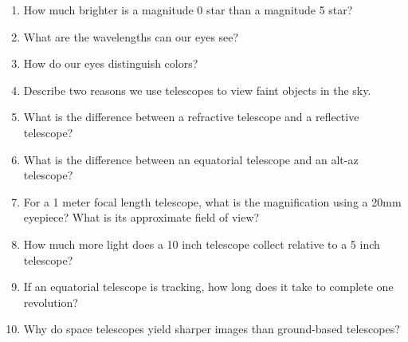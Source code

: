 
\begin{enumerate}
\item How much brighter is a magnitude 0 star than a magnitude 5 star?
\vspace{80pt}
\item What are the wavelengths can our eyes see?
\vspace{80pt}
\item How do our eyes distinguish colors?
\vspace{80pt}
\item Describe two reasons we use telescopes to view faint objects in
  the sky.
\vspace{80pt}
\item  What is the difference between a refractive telescope and a
  reflective telescope?
\vspace{80pt}
\item  What is the difference between an equatorial telescope and an
  alt-az telescope?
\vspace{80pt}
\item For a 1 meter focal length telescope, what is the magnification
  using a 20mm eyepiece? What is its approximate field of view?
\vspace{80pt}
\item How much more light does a 10 inch telescope collect relative to
  a 5 inch telescope?
\vspace{80pt}
\item If an equatorial telescope is tracking, how long does it take to
  complete one revolution? 
\vspace{80pt}
\item Why do space telescopes yield sharper images than ground-based
  telescopes?
\vspace{80pt}
\end{enumerate}
